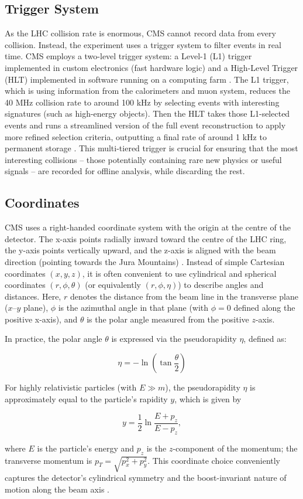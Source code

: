 \subsection{Trigger System}
As the LHC collision rate is enormous, CMS cannot record data from every collision. Instead, the experiment uses a trigger system to filter events in real time. CMS employs a two-level trigger system: a Level-1 (L1) trigger implemented in custom electronics (fast hardware logic) and a High-Level Trigger (HLT) implemented in software running on a computing farm \cite{Khachatryan_2017}. The L1 trigger, which is using information from the calorimeters and muon system, reduces the 40 MHz collision rate to around 100 kHz by selecting events with interesting signatures (such as high-energy objects). Then the HLT takes those L1-selected events and runs a streamlined version of the full event reconstruction to apply more refined selection criteria, outputting a final rate of around 1 kHz to permanent storage \cite{Khachatryan_2017}. This multi-tiered trigger is crucial for ensuring that the most interesting collisions – those potentially containing rare new physics or useful signals – are recorded for offline analysis, while discarding the rest.

\subsection{Coordinates}
CMS uses a right-handed coordinate system with the origin at the centre of the detector. The x-axis points radially inward toward the centre of the LHC ring, the y-axis points vertically upward, and the z-axis is aligned with the beam direction (pointing towards the Jura Mountains) \cite{Chatrychan_2008}. Instead of simple Cartesian coordinates $(x,y,z)$, it is often convenient to use cylindrical and spherical coordinates $(r,\phi,\theta)$ (or equivalently $(r,\phi,\eta)$) to describe angles and distances. Here, $r$ denotes the distance from the beam line in the transverse plane ($x$–$y$ plane), $\phi$ is the azimuthal angle in that plane (with $\phi=0$ defined along the positive x-axis), and $\theta$ is the polar angle measured from the positive $z$-axis.

In practice, the polar angle $\theta$ is expressed via the pseudorapidity $\eta$, defined as:

\begin{equation}
    \eta = - \ln \left( \tan \frac{\theta}{2}\right)
\end{equation}

For highly relativistic particles (with $E \gg m$), the pseudorapidity $\eta$ is approximately equal to the particle’s rapidity $y$, which is given by

\begin{equation}
    y = \frac{1}{2} \ln\frac{E+p_z}{E-p_z},
\end{equation}

where $E$ is the particle’s energy and $p_z$ is the $z$-component of the momentum; the transverse momentum is $p_T=\sqrt{p_x^2+p_y^2}$. This coordinate choice conveniently captures the detector’s cylindrical symmetry and the boost-invariant nature of motion along the beam axis \cite{Chatrychan_2008}.